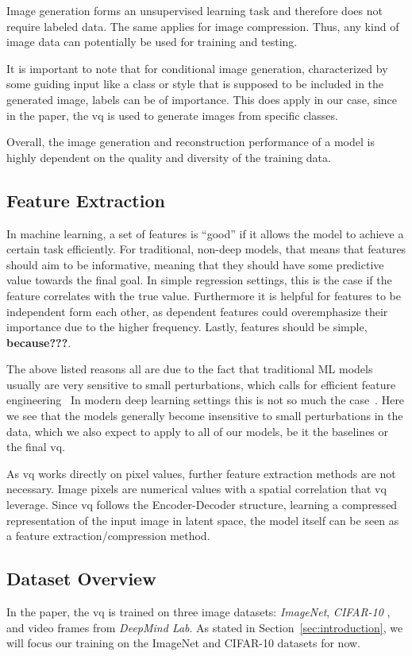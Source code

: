 Image generation forms an unsupervised learning task and therefore does not require labeled data.
The same applies for image compression.
Thus, any kind of image data can potentially be used for training and testing.

It is important to note that for conditional image generation, characterized by some guiding input like a class or
style that is supposed to be included in the generated image, labels can be of importance.
This does apply in our case, since in the paper, the \ac{vq} is used to generate images from specific classes.

Overall, the image generation and reconstruction performance of a model is highly dependent on the quality and diversity
of the training data.

\subsection{Feature Extraction}\label{subsec:feature-extraction}
In machine learning, a set of features is ``good'' if it allows the model to achieve a certain task
efficiently.
For traditional, non-deep models, that means that features should aim to be informative, meaning that
they should have some predictive value towards the final goal.
In simple regression settings, this is the case if the feature correlates with the true value.
Furthermore it is helpful for features to be independent form each other, as dependent features could overemphasize
their importance due to the higher frequency.
Lastly, features should be simple, \textbf{because???}.

The above listed reasons all are due to the fact that traditional ML models usually are very sensitive to small
perturbations, which calls for efficient feature engineering~\cite{citationNeeded}
In modern deep learning settings this is not so much the case~\cite{citationNeeded}.
Here we see that the models generally become insensitive to small perturbations in the data, which we also expect to
apply to all of our models, be it the baselines or the final \ac{vq}.

As \ac{vq} works directly on pixel values, further feature extraction methods are not necessary.
Image pixels are numerical values with a spatial correlation that \ac{vq} leverage.
Since \ac{vq} follows the Encoder-Decoder structure, learning a compressed representation of the input image in latent
space, the model itself can be seen as a feature extraction/compression method.

\subsection{Dataset Overview}\label{subsec:dataset-overview}
In the paper, the \ac{vq} is trained on three image datasets: \textit{ImageNet}, \textit{CIFAR-10}
, and video frames from \textit{DeepMind Lab}.
As stated in Section~\ref{sec:introduction}, we will focus our training on the ImageNet and CIFAR-10
datasets for now.

